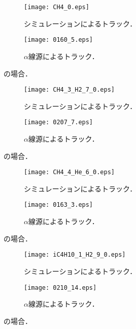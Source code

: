 \documentclass[../master]{subfiles}
\begin{document}
\begin{figure}
  \centering
  \begin{subfigure}{0.48\columnwidth}
    \centering
    \texttt{[image: CH4\_0.eps]}
    \caption{シミュレーションによるトラック．}
  \end{subfigure}
  \begin{subfigure}{0.48\columnwidth}
    \centering
    \texttt{[image: 0160\_5.eps]}
    \caption{$\alpha$線源によるトラック．}
  \end{subfigure}
  \caption{\Methane の場合．}
  \label{fig::track_comp_ch4}
\end{figure}

\begin{figure}
  \centering
  \begin{subfigure}{0.48\columnwidth}
    \centering
    \texttt{[image: CH4\_3\_H2\_7\_0.eps]}
    \caption{シミュレーションによるトラック．}
  \end{subfigure}
  \begin{subfigure}{0.48\columnwidth}
    \centering
    \texttt{[image: 0207\_7.eps]}
    \caption{$\alpha$線源によるトラック．}
  \end{subfigure}
  \caption{\MethaneHydro の場合．}
  \label{fig::track_comp_ch4_h2}
\end{figure}

\begin{figure}
  \centering
  \begin{subfigure}{0.48\columnwidth}
    \centering
    \texttt{[image: CH4\_4\_He\_6\_0.eps]}
    \caption{シミュレーションによるトラック．}
  \end{subfigure}
  \begin{subfigure}{0.48\columnwidth}
    \centering
    \texttt{[image: 0163\_3.eps]}
    \caption{$\alpha$線源によるトラック．}
  \end{subfigure}
  \caption{\MethaneHerium の場合．}
  \label{fig::track_comp_ch4_he}
\end{figure}

\begin{figure}
  \centering
  \begin{subfigure}{0.48\columnwidth}
    \centering
    \texttt{[image: iC4H10\_1\_H2\_9\_0.eps]}
    \caption{シミュレーションによるトラック．}
  \end{subfigure}
  \begin{subfigure}{0.48\columnwidth}
    \centering
    \texttt{[image: 0210\_14.eps]}
    \caption{$\alpha$線源によるトラック．}
  \end{subfigure}
  \caption{\isoButaneHydro の場合．}
  \label{fig::track_comp_ic4h10_h2}
\end{figure}
\end{document}
